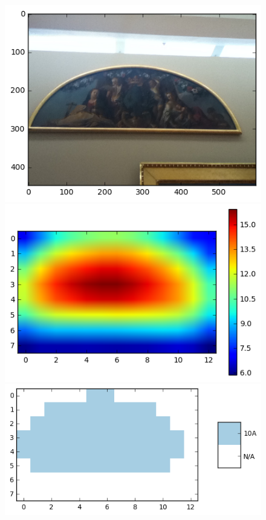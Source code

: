 \begin{figure}
  \centering
  \begin{minipage}[c]{.33\linewidth}
    \includegraphics[width=\textwidth]{figures/sample1_10A-0519.png}
  \end{minipage} \hfill
  \begin{minipage}[c]{.33\linewidth}
    \includegraphics[width=\textwidth]{figures/sample1_heatmap.png}
  \end{minipage} \hfill
  \begin{minipage}[c]{.32\linewidth}
    \includegraphics[width=\textwidth]{figures/sample1_labels.png}
  \end{minipage}


\end{figure}
